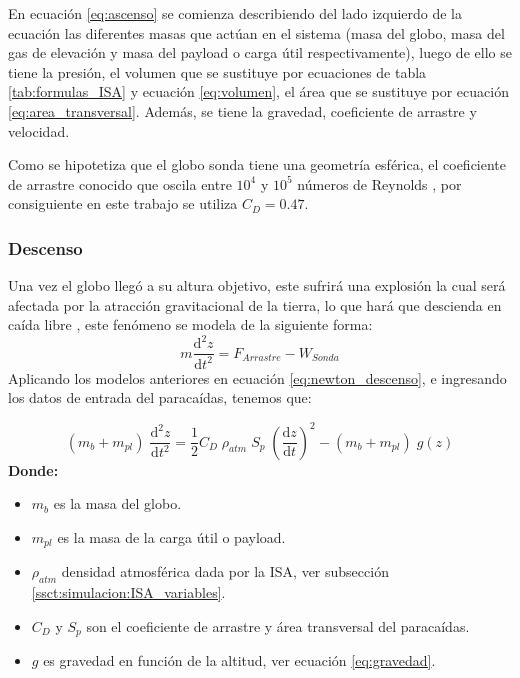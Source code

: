 En ecuación \ref{eq:ascenso} se comienza describiendo del lado izquierdo de la ecuación las diferentes masas que actúan en el sistema (masa del globo, masa del gas de elevación y masa del payload o carga útil respectivamente), luego de ello se tiene la presión, el volumen que se sustituye por ecuaciones de tabla \ref{tab:formulas_ISA} y ecuación  \ref{eq:volumen}, el  área que se sustituye por ecuación \ref{eq:area_transversal}. Además, se tiene la gravedad, coeficiente de arrastre y velocidad.

Como se hipotetiza que el globo sonda tiene una geometría esférica, el coeficiente de arrastre conocido que oscila entre $10^{4} $  y $10^{5}$ números de Reynolds \cite{constante_CD_y_formula_ascenso, Constatntes_CD_HAB}, por consiguiente en este trabajo se utiliza $C_{D} = 0.47$. 
 

\subsubsection{Descenso}

Una vez el globo llegó a su altura objetivo, este sufrirá una explosión la cual será afectada por la atracción gravitacional de la tierra, lo que hará que descienda en caída libre \cite{modelo_free_falling, redbull_free_falling}, este fenómeno se modela de la siguiente forma:
\begin{equation}
    \label{eq:newton_descenso}
  m \frac{\mathrm{d^2} z }{\mathrm{d} t^2}  =  F_{Arrastre} -W_{Sonda}
\end{equation}
Aplicando los modelos anteriores en ecuación \ref{eq:newton_descenso}, e ingresando los datos de entrada del paracaídas, tenemos que:

\begin{equation}
    \label{eq:descenso}
     ( m_{b} + m_{pl} ) \; \frac{\mathrm{d^2} z }{\mathrm{d} t^2}  =   \frac{1}{2} C_{D} \; \rho_{atm} \; S_{p} \; \left ( \frac{\mathrm{d} z }{\mathrm{d} t} \right )^{2} -( m_{b} + m_{pl} ) \; g(z) 
\end{equation}
\textbf{Donde:}
\begin{itemize}
    \item $m_{b}$ es la masa del globo.
    \item $m_{pl}$ es la masa de la carga útil o payload.
    \item $\rho_{atm}$ densidad atmosférica dada por la ISA, ver subsección \ref{ssct:simulacion:ISA_variables}. 
    \item $C_{D}$ y $S_{p}$  son el coeficiente de arrastre  y área transversal del paracaídas.
    \item     $g$ es gravedad en función de la altitud, ver ecuación \ref{eq:gravedad}.
\end{itemize}

